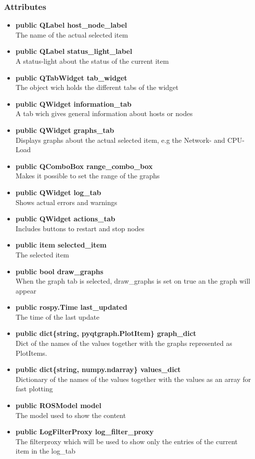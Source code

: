 \subsubsection{Attributes}
\begin{itemize}
  \item \textbf{public QLabel host\_node\_label}\\
  The name of the actual selected item
  \item \textbf{public QLabel status\_light\_label}\\
  A status-light about the status of the current item
  \item \textbf{public QTabWidget tab\_widget}\\
  The object wich holds the different tabs of the widget
  \item \textbf{public QWidget information\_tab}\\
  A tab wich gives general information about hosts or nodes 
  \item \textbf{public QWidget graphs\_tab}\\
  Displays graphs about the actual selected item, e.g the Network- and
  CPU-Load
  \item \textbf{public QComboBox range\_combo\_box}\\
  Makes it possible to set the range of the graphs
  \item \textbf{public QWidget log\_tab}\\
  Shows actual errors and warnings
  \item \textbf{public QWidget actions\_tab}\\
  Includes buttons to restart and stop nodes
  \item \textbf{public item selected\_item}\\
  The selected item
  \item \textbf{public bool draw\_graphs}\\
  When the graph tab is selected, draw\_graphs is set on true an the graph will
  appear
  \item \textbf{public rospy.Time last\_updated}\\
  The time of the last update
  \item \textbf{public dict\{string, pyqtgraph.PlotItem\} graph\_dict}\\
  Dict of the names of the values together with the graphs represented as PlotItems.
  \item \textbf{public dict\{string, numpy.ndarray\} values\_dict}\\
  Dictionary of the names of the values together with the values as an array for fast plotting
  \item \textbf{public ROSModel model}\\
  The model used to show the content
  \item \textbf{public LogFilterProxy log\_filter\_proxy}\\
  The filterproxy which will be used to show only the entries of the current item in the log\_tab
  
\end{itemize}
